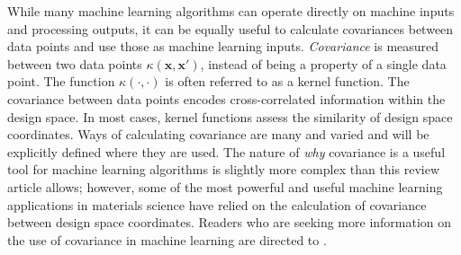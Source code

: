 While many machine learning algorithms can operate directly on machine inputs and processing outputs, it can be equally useful to calculate covariances between data points and use those as machine learning inputs. \textit{Covariance} is measured between two data points $\kappa (\mathbf{x},\mathbf{x}')$, instead of being a property of a single data point. The function $\kappa(\cdot,\cdot)$ is often referred to as a kernel function. The covariance between data points encodes cross-correlated information within the design space. In most cases, kernel functions assess the similarity of design space coordinates. Ways of calculating covariance are many and varied and will be explicitly defined where they are used. The nature of \textit{why} covariance is a useful tool for machine learning algorithms is slightly more complex than this review article allows; however, some of the most powerful and useful machine learning applications in materials science have relied on the calculation of covariance between design space coordinates. Readers who are seeking more information on the use of covariance in machine learning are directed to \cite{KernelMethod}.